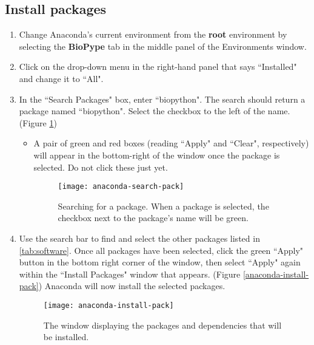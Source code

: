 \subsection{Install packages}
    \begin{enumerate}
        \item Change Anaconda's current environment from the \textbf{root} environment by selecting the \textbf{BioPype} tab in the middle panel of the Environments window.
        \item Click on the drop-down menu in the right-hand panel that says ``Installed" and change it to ``All".
        \item In the ``Search Packages" box, enter ``biopython". The search should return a package named ``biopython". Select the checkbox to the left of the name. (Figure \ref{anaconda-search-pack})
        \begin{itemize}
            \item A pair of green and red boxes (reading ``Apply" and ``Clear", respectively) will appear in the bottom-right of the window once the package is selected. Do not click these just yet. 
    \begin{figure}[hbtp]
        \begin{center}
        \texttt{[image: anaconda-search-pack]}
        \caption{Searching for a package. When a package is selected, the checkbox next to the package's name will be green.}
        \label{anaconda-search-pack}
        \end{center}
    \end{figure}
        \end{itemize}
        \item Use the search bar to find and select the other packages listed in \autoref{tab:software}. Once all packages have been selected, click the green ``Apply" button in the bottom right corner of the window, then select ``Apply" again within the ``Install Packages" window that appears. (Figure \ref{anaconda-install-pack}) Anaconda will now install the selected packages.
    \begin{figure}[hbtp]
        \begin{center}
        \texttt{[image: anaconda-install-pack]}
        \caption{The window displaying the packages and dependencies that will be installed.}

\end{center}
\end{figure}
\end{enumerate}
